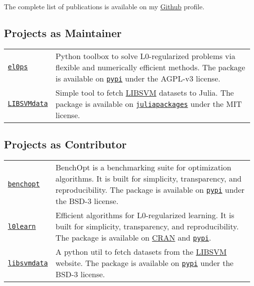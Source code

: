 The complete list of publications is available on my \href{https://github.com/TheoGuyard}{Github} profile.

\subsection*{Projects as Maintainer}
\label{tools:projects-as-maintainer}

\begin{longtable}[l]{@{}p{}p{}}
    \href{https://github.com/TheoGuyard/El0ps/tree/main}{\texttt{el0ps}} & Python toolbox to solve L0-regularized problems via flexible and numerically efficient methods. The package is available on \href{https://pypi.org/project/el0ps/}{\texttt{pypi}} under the AGPL-v3 license. \\
    \href{https://github.com/TheoGuyard/LIBSVMdata.jl}{\texttt{LIBSVMdata}} & Simple tool to fetch \href{https://www.csie.ntu.edu.tw/~cjlin/libsvmtools/datasets/}{LIBSVM} datasets to Julia. The package is available on \href{https://juliapackages.com/packages/libsvmdata}{\texttt{juliapackages}} under the MIT license. \\
\end{longtable}

\subsection*{Projects as Contributor}
\label{tools:projects-as-contributor}

\begin{longtable}[l]{@{}p{}p{}}
    \href{https://github.com/benchopt/benchopt}{\texttt{benchopt}} & BenchOpt is a benchmarking suite for optimization algorithms. It is built for simplicity, transparency, and reproducibility. The package is available on \href{https://pypi.org/project/benchopt/}{\texttt{pypi}} under the BSD-3 license. \\
    \href{https://github.com/hazimehh/L0Learn}{\texttt{l0learn}} & Efficient algorithms for L0-regularized learning. It is built for simplicity, transparency, and reproducibility. The package is available on \href{https://cran.r-project.org/web/packages/L0Learn/index.html}{CRAN} and \href{https://pypi.org/project/l0learn/}{\texttt{pypi}}. \\
    \href{https://github.com/mathurinm/libsvmdata}{\texttt{libsvmdata}} & A python util to fetch datasets from the \href{https://www.csie.ntu.edu.tw/~cjlin/libsvmtools/datasets/}{LIBSVM} website. The package is available on \href{https://pypi.org/project/libsvmdata/}{\texttt{pypi}} under the BSD-3 license. \\
\end{longtable}

